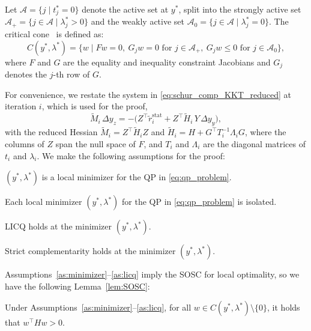 \documentclass[class=scrbook, crop=false]{standalone}
\begin{document}
Let $\mathcal{A} = \{j \mid t_j^* = 0\}$ denote the active set at $y^*$,
split into the strongly active set $\mathcal{A}_+ = \{j \in \mathcal{A} \mid \lambda_j^* > 0\}$
and the weakly active set $\mathcal{A}_0 = \{j \in \mathcal{A} \mid \lambda_j^* = 0\}$.
The critical cone~\cite{nocedal2006numerical} is defined as:
\begin{equation*}
    C(y^*,\lambda^*) = \{ w \mid Fw = 0,\ G_j w = 0 \text{ for } j \in \mathcal{A}_+,\ G_j w \le 0 \text{ for } j \in \mathcal{A}_0 \},
\end{equation*}
where $F$ and $G$ are the equality and inequality constraint Jacobians and $G_j$ denotes the $j$-th row of $G$.

For convenience, we restate the system in \eqref{eq:schur_comp_KKT_reduced} at iteration $i$, which is used for the proof,
\begin{equation*}
    \tilde{M}_i \,\Delta y_z
    = -\big( Z^\top \tilde{r}_i^{\mathrm{stat}}
             + Z^\top \tilde{H}_i\, Y\,\Delta y_y \big),
\end{equation*}
with the reduced Hessian $\tilde{M}_i = Z^\top \tilde{H}_i Z$ and $\tilde{H}_i = H + G^\top T_i^{-1}\Lambda_i G$,
where the columns of $Z$ span the null space of $F$, 
and $T_i$ and $\Lambda_i$ are the diagonal matrices of $t_i$ and $\lambda_i$.
We make the following assumptions for the proof:
\begin{assumption}
    \label{as:minimizer}
    $(y^*, \lambda^*)$ is a local minimizer for the \gls{QP} in \eqref{eq:qp_problem}.
\end{assumption}

\begin{assumption}
    \label{as:isolated}
    Each local minimizer $(y^*,\lambda^*)$ for the \gls{QP} in \eqref{eq:qp_problem} is isolated.
\end{assumption}

\begin{assumption}
    \label{as:licq}
    \Gls{LICQ} holds at the minimizer $(y^*, \lambda^*)$.
\end{assumption}

\begin{assumption}
    \label{as:strict_comp}
    Strict complementarity holds at the minimizer $(y^*, \lambda^*)$.
\end{assumption}

Assumptions~\ref{as:minimizer}--\ref{as:licq} imply the \gls{SOSC} for local optimality,
so we have the following Lemma~\ref{lem:SOSC}:
\begin{lemma}
    \label{lem:SOSC}
    Under Assumptions~\ref{as:minimizer}--\ref{as:licq}, for all $w \in C(y^*,\lambda^*) \setminus \{0\}$, it holds that $w^\top H w > 0$.
\end{lemma}
\end{document}

